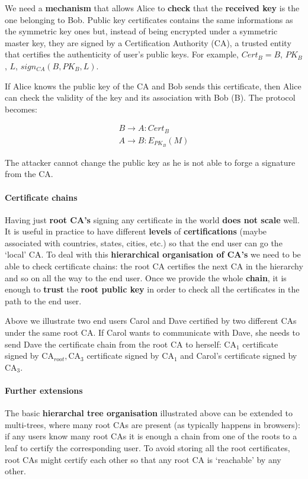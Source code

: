 We need a \textbf{mechanism} that allows Alice to \textbf{check} that the \textbf{received key} is the one belonging to Bob. Public key certificates contains the same informations as the symmetric key ones but, instead of being encrypted under a symmetric master key, they are signed by a Certification Authority (CA), a trusted entity that certifies the authenticity of user’s public keys. For example, $Cert_B = B$, $PK_B$, $L$, $sign_{CA}(B, PK_B, L)$. 

If Alice knows the public key of the CA and Bob sends this certificate, then Alice can check the validity of the key and its association with Bob (B). The protocol becomes:

$$\begin{array}{l} B \rightarrow A: Cert_B \\ A\rightarrow B: E_{PK_B}(M) \end{array}$$

The attacker cannot change the public key as he is not able to forge a signature from the CA.

\paragraph{Certificate chains}
Having just \textbf{root CA’s} signing any certificate in the world \textbf{does not scale} well. It is useful in practice to have different \textbf{levels} of \textbf{certifications} (maybe associated with countries, states, cities, etc.) so that the end user can go the ‘local’ CA. To deal with this \textbf{hierarchical organisation of CA’s} we need to be able to check certificate chains: the root CA certifies the next CA in the hierarchy and so on all the way to the end user. Once we provide the whole \textbf{chain}, it is enough to \textbf{trust} the \textbf{root public key} in order to check all the certificates in the path to the end user.


Above we illustrate two end users Carol and Dave certified by two different CAs under the same root CA. If Carol wants to communicate with Dave, she needs to send Dave the certificate chain from the root CA to herself: $\mathrm{CA}_1$ certificate signed by $\mathrm{CA}_{root}, \mathrm{CA}_3$ certificate signed by $\mathrm{CA}_1$ and Carol’s certificate signed by $\mathrm{CA}_3$.

\paragraph{Further extensions}
The basic \textbf{hierarchal tree organisation} illustrated above can be extended to multi-trees, where many root CAs are present (as typically happens in browsers): if any users know many root CAs it is enough a chain from one of the roots to a leaf to certify the corresponding user. To avoid storing all the root certificates, root CAs might certify each other so that any root CA is ‘reachable’ by any other.

